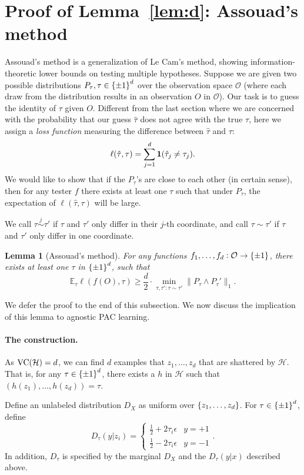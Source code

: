 \documentclass{article}
\newtheorem{lemma}{Lemma}
\DeclareMathOperator*{\VC}{{\rm VC}}
\newcommand{\EE}{\mathbb{E}}
\newcommand{\Hcal}{\mathcal{H}}
\newcommand{\Ocal}{\mathcal{O}}
\newcommand*{\one}{{\bf 1}}
\begin{document}
\section{Proof of Lemma~\ref{lem:d}: Assouad's method}
Assouad's method is a generalization of Le Cam's method, showing
information-theoretic lower bounds on testing multiple hypotheses.
Suppose we are given two possible distributions $P_\tau, \tau \in \cbr{\pm 1}^d$
over the observation space $\Ocal$ (where each draw from the distribution results in an observation $O$ in $\Ocal$).
Our task is to guess the identity of $\tau$ given $O$. Different from
the last section where we are concerned with the probability that our
guess $\hat{\tau}$ does not agree with the true $\tau$, here we assign a
{\em loss function} measuring the difference between $\hat{\tau}$ and $\tau$:
\[ \ell(\hat{\tau}, \tau) = \sum_{j=1}^d \one(\hat{\tau}_j \neq \tau_j). \]
We would like to show that if the $P_\tau$'s are close to each other (in certain sense),
then for any tester $f$ there exists at least one $\tau$ such that under $P_\tau$,
the expectation of $\ell(\hat{\tau}, \tau)$ will be large.

We call $\tau\stackrel{j}{\sim}\tau'$ if $\tau$ and $\tau'$ only differ
in their $j$-th coordinate, and call $\tau \sim \tau'$ if $\tau$ and $\tau'$
only differ in one coordinate.

\begin{lemma}[Assouad's method]
For any functions $f_1, \ldots, f_d: \Ocal \to \cbr{\pm 1}$, there exists at least one
$\tau$ in $\cbr{\pm 1}^d$, such that
\[ \EE_{\tau} \ell(f(O), \tau) \geq \frac{d}{2} \cdot \min_{\tau, \tau': \tau \sim \tau'} \| P_\tau \wedge P_\tau' \|_1.  \]
\label{lem:assouad}
\end{lemma}

We defer the proof to the end of this subsection. We now discuss the implication of this lemma to agnostic PAC learning.

\paragraph{The construction.} As $\VC(\Hcal) = d$, we can find $d$ examples
 that $z_1,\ldots,z_d$ that are shattered by $\Hcal$. That is, for any $\tau \in \cbr{\pm 1}^d$, there exists a $h$ in $\Hcal$ such that $(h(z_1), \ldots, h(z_d)) = \tau$.

Define an unlabeled distribution $D_X$ as uniform over $\cbr{z_1,\ldots,z_d}$. For $\tau \in \cbr{\pm 1}^d$, define
\[ D_\tau(y|z_i) = \begin{cases} \frac12 + 2 \tau_i \epsilon & y = +1 \\ \frac12 - 2 \tau_i \epsilon & y = -1 \end{cases}. \]
In addition, $D_\tau$ is specified by the marginal $D_X$ and the $D_\tau(y|x)$ described above.
\end{document}
